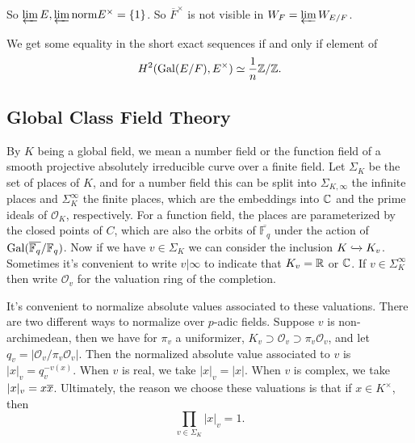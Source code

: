 So $\varprojlim{E}, \varprojlim{\mathrm{norm}} E^\times = \{1 \}$. So
$\overline{F}^\times$ is not visible in $W_F = \varprojlim W_{E/F}$.


We get some equality in the short exact sequences if and only if element of
\[H^2(\mathrm{Gal}{(E / F)}, E^\times) \simeq \frac{1}{n} \mathbb{Z}/\mathbb{Z}.\]

\subsection{Global Class Field Theory} By $K$ being a global field, we mean a
number field or the function field of a smooth projective absolutely irreducible
curve over a finite field.  Let $\Sigma_K$ be the set of places of $K$, and for
a number field this can be split into $\Sigma_{K, \infty}$ the infinite places
and $\Sigma_K^{\infty}$ the finite places, which are the embeddings into
$\mathbb{C}$ and the prime ideals of $\mathcal{O}_K$, respectively. For a function
field, the places are parameterized by the closed points of $C$, which are also
the orbits of $\overline{\mathbb{F}_q}$ under the action of
$\mathrm{Gal}{(\overline{\mathbb{F}_q} / \mathbb{F}_q)}$.  Now if we have $v \in \Sigma_K$
we can consider the inclusion $K \xhookrightarrow{} K_v$. Sometimes it's
convenient to write $v | \infty$ to indicate that $K_v = \mathbb{R}$ or $\mathbb{C}$.
If $v \in \Sigma_K^\infty$ then write $\mathcal{O}_v$ for the valuation ring of
the completion.

It's convenient to normalize absolute values associated to these valuations.
There are two different ways to normalize over $p$-adic fields. Suppose $v$ is
non-archimedean, then we have for $\pi_v$ a uniformizer, $K_v \supset
\mathcal{O}_v \supset \pi_v \mathcal{O}_v$, and let $q_v = | \mathcal{O}_v /
\pi_v \mathcal{O}_v | $. Then the normalized absolute value associated to $v$ is
$|x|_v = q_v^{-v(x)}$. When $v$ is real, we take $|x|_v = |x|$. When $v$ is
complex, we take $|x|_v = x \overline{x}$. Ultimately, the reason we choose these
valuations is that if $x \in K^\times$, then \[ \prod_{v \in \Sigma_K} |x|_v = 1.\]

